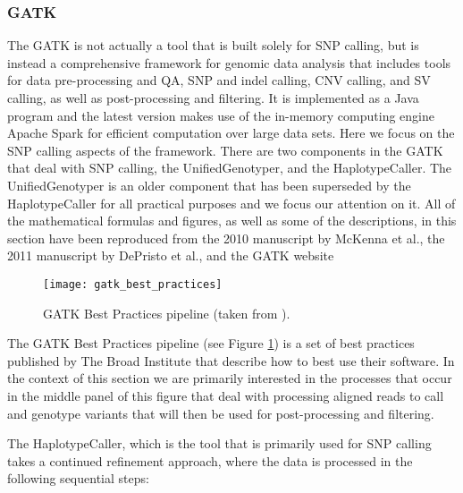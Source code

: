 \subsubsection{GATK}
\label{sec:bg_gatk}
The GATK\autocite{depristo2011framework} is not actually a tool that is built solely for SNP calling, but is instead a comprehensive framework for genomic data analysis that includes tools for data pre-processing and QA, SNP and indel calling, CNV calling, and SV calling, as well as post-processing and filtering. It is implemented as a Java program and the latest version makes use of the in-memory computing engine Apache Spark for efficient computation over large data sets. Here we focus on the SNP calling aspects of the framework. There are two components in the GATK that deal with SNP calling, the UnifiedGenotyper, and the HaplotypeCaller. The UnifiedGenotyper is an older component that has been superseded by the HaplotypeCaller for all practical purposes and we focus our attention on it. All of the mathematical formulas and figures, as well as some of the descriptions, in this section have been reproduced from the 2010 manuscript by McKenna et al.\autocite{mckenna2010genome}, the 2011 manuscript by DePristo et al.\autocite{depristo2011framework}, and the GATK website\autocite{gatkwebsite}

\begin{figure}[!htb]
\texttt{[image: gatk\_best\_practices]}
\centering
\caption {GATK Best Practices pipeline (taken from \autocite{gatkwebsite}).}
\label{fig:gatk_best_practices}
\end{figure}

The GATK Best Practices pipeline (see Figure \ref{fig:gatk_best_practices}) is a set of best practices published by The Broad Institute that describe how to best use their software. In the context of this section we are primarily interested in the processes that occur in the middle panel of this figure that deal with processing aligned reads to call and genotype variants that will then be used for post-processing and filtering.

The HaplotypeCaller, which is the tool that is primarily used for SNP calling takes a continued refinement approach, where the data is processed in the following sequential steps:

